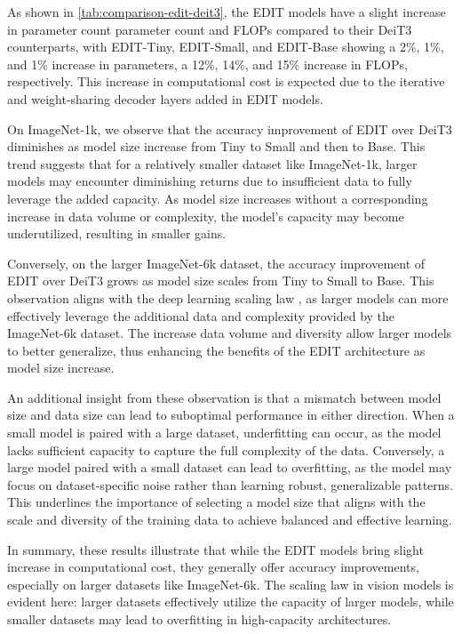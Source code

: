 As shown in \cref{tab:comparison-edit-deit3}, the EDIT models have a slight increase in parameter count parameter count and FLOPs compared to their DeiT3 counterparts, with EDIT-Tiny, EDIT-Small, and EDIT-Base showing a 2\%, 1\%, and 1\% increase in parameters, a 12\%, 14\%, and 15\% increase in FLOPs, respectively. This increase in computational cost is expected due to the iterative and weight-sharing decoder layers added in EDIT models.

On ImageNet-1k, we observe that the accuracy improvement of EDIT over DeiT3 diminishes as model size increase from Tiny to Small and then to Base.
This trend suggests that for a relatively smaller dataset like ImageNet-1k, larger models may encounter diminishing returns due to insufficient data to fully leverage the added capacity.
As model size increases without a corresponding increase in data volume or complexity, the model's capacity may become underutilized, resulting in smaller gains.

Conversely, on the larger ImageNet-6k dataset, the accuracy improvement of EDIT over DeiT3 grows as model size scales from Tiny to Small to Base.
This observation aligns with the deep learning scaling law \cite{Zhai_2022_CVPR,kaplan2020scaling}, as larger models can more effectively leverage the additional data and complexity provided by the ImageNet-6k dataset.
The increase data volume and diversity allow larger models to better generalize, thus enhancing the benefits of the EDIT architecture as model size increase.

An additional insight from these observation is that a mismatch between model size and data size can lead to suboptimal performance in either direction.
When a small model is paired with a large dataset, underfitting can occur, as the model lacks sufficient capacity to capture the full complexity of the data.
Conversely, a large model paired with a small dataset can lead to overfitting, as the model may focus on dataset-specific noise rather than learning robust, generalizable patterns. This underlines the importance of selecting a model size that aligns with the scale and diversity of the training data to achieve balanced and effective learning.

In summary, these results illustrate that while the EDIT models bring slight increase in computational cost, they generally offer accuracy improvements, especially on larger datasets like ImageNet-6k.
The scaling law in vision models is evident here: larger datasets effectively utilize the capacity of larger models, while smaller datasets may lead to overfitting in high-capacity architectures.

